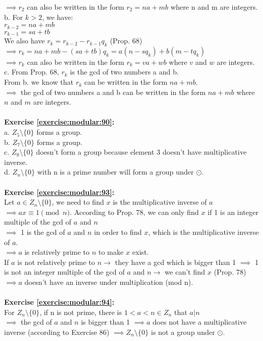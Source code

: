 $\implies r_2$ can also be written in the form $r_2=na+mb$ where n and m are integers.\\
b. For $k>2$, we have:\\
$r_{k-2}=na+mb$\\
$r_{k-1}=sa+tb$\\
We also have $r_k=r_{k-2}-r_{k-1}q_k$ (Prop. 68)\\
$\implies r_k=na+mb-(sa+tb)q_k=a(n-sq_k)+b(m-tq_k)$\\
$\implies r_k$ can also be written in the form $r_k=va+wb$ where $v$ and $w$ are integers.\\
c. From Prop. 68, $r_k$ is the gcd of two numbers a and b.\\
From b. we know that $r_k$ can be written in the form $na+mb$.\\
$\implies$  the gcd of two numbers a and b can be written in the form $na+mb$ where $n$ and $m$ are integers.\\
\\
\textbf{Exercise \ref{exercise:modular:90}:}\\
a. $Z_5 \setminus \{0\}$ forms a group.\\
b. $Z_7 \setminus \{0\}$ forms a group.\\
c. $Z_9 \setminus \{0\}$ doesn't form a group because element 3 doesn't have multiplicative inverse.\\
d. $Z_n \setminus \{0\}$ with n is a prime number will form a group under $\odot$.\\
\\
\textbf{Exercise \ref{exercise:modular:93}:}\\
Let $a \in Z_n \setminus \{0\}$, we need to find $x$ is the multiplicative inverse of $a$\\
$\implies ax \equiv 1 \pmod{n}$.
According to Prop. 78, we can only find $x$ if 1 is an integer multiple of the gcd of $a$ and $n$\\
$\implies$  1 is the gcd of $a$ and $n$ in order to find $x$, which is the multiplicative inverse of $a$.\\
$\implies a$ is relatively prime to $n$ to make $x$ exist.\\
If $a$ is not relatively prime to $n \to$ they have a gcd which is bigger than 1 $\implies$  1 is not an integer multiple of the gcd of $a$ and $n \to$ we can't find $x$ (Prop. 78) $\implies a$ doesn't have an inverse under multiplication (mod n).\\
\\
\textbf{Exercise \ref{exercise:modular:94}:}\\
For $Z_n \setminus \{0\}$, if n is not prime, there is $1<a<n \in Z_n$ that $a|n$\\
$\implies$  the gcd of $a$ and $n$ is bigger than 1 $\implies a$ does not have a multiplicative inverse (according to Exercise 86) $\implies Z_n \setminus \{0\}$ is not a group under $\odot$.\\



